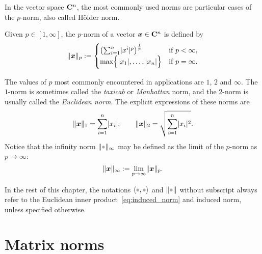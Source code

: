 In the vector space $\mathbf C^n$,
the most commonly used norms are particular cases of the $p$-norm, also called H\"older norm.
\begin{definition}
    \label{definition:pnorm_vector}
    Given $p \in [1, \infty]$,
    the $p$-norm of a vector $\mathbf{\boldsymbol{x}} \in \mathbf C^n$ is defined by
    \[
        \lVert\mathbf{\boldsymbol{x}}\rVert_p :=
        \begin{cases}
            \left( \sum_{i=1}^{n} \lvert x^i\rvert^p \right)^{\frac{1}{p}} & \text{if $p < \infty$}, \\
            \max \Bigl\{ \lvert x_1\rvert, \dotsc, \lvert x_n\rvert \Bigr\} & \text{if $p = \infty$}.
        \end{cases}
    \]
\end{definition}
The values of $p$ most commonly encountered in applications are $1$, $2$ and $\infty$.
The $1$-norm is sometimes called the \emph{taxicab} or \emph{Manhattan} norm,
and the $2$-norm is usually called the \emph{Euclidean norm}.
The explicit expressions of these norms are
\[
    \lVert\mathbf{\boldsymbol{x}}\rVert_1 = \sum_{i=1}^{n} \lvert x_i\rvert,
    \qquad
    \lVert\mathbf{\boldsymbol{x}}\rVert_2 = \sqrt{\sum_{i=1}^{n} \lvert x_i\rvert^2}.
\]
Notice that the infinity norm $\norm{\placeholder}_{\infty}$ may be defined as the limit of the $p$-norm as $p \to \infty$:
\[
    \lVert\mathbf{\boldsymbol{x}}\rVert_{\infty}
    := \lim_{p \to \infty} \lVert\mathbf{\boldsymbol{x}}\rVert_p.
\]

In the rest of this chapter,
the notations $\ip{\placeholder,\placeholder}$ and $\norm{\placeholder}$ without subscript always refer to the Euclidean inner product~\eqref{eq:induced_norm} and induced norm,
unless specified otherwise.

\section{Matrix norms}%
\label{sec:matrix_norms}

